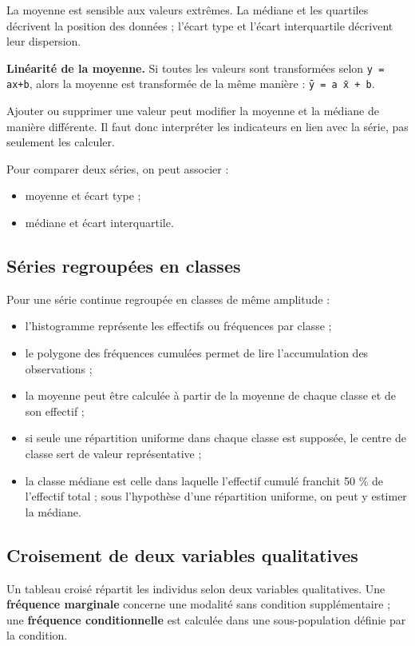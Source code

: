 La moyenne est sensible aux valeurs extrêmes. La médiane et les quartiles décrivent la position des données ; l'écart type et l'écart interquartile décrivent leur dispersion.

\textbf{Linéarité de la moyenne.} Si toutes les valeurs sont transformées selon \texttt{y = ax+b}, alors la moyenne est transformée de la même manière : \texttt{ȳ = a x̄ + b}.

Ajouter ou supprimer une valeur peut modifier la moyenne et la médiane de manière différente. Il faut donc interpréter les indicateurs en lien avec la série, pas seulement les calculer.

Pour comparer deux séries, on peut associer :

\begin{itemize}
\item moyenne et écart type ;
\item médiane et écart interquartile.
\end{itemize}

\subsection{Séries regroupées en classes}

Pour une série continue regroupée en classes de même amplitude :

\begin{itemize}
\item l'histogramme représente les effectifs ou fréquences par classe ;
\item le polygone des fréquences cumulées permet de lire l'accumulation des observations ;
\item la moyenne peut être calculée à partir de la moyenne de chaque classe et de son effectif ;
\item si seule une répartition uniforme dans chaque classe est supposée, le centre de classe sert de valeur représentative ;
\item la classe médiane est celle dans laquelle l'effectif cumulé franchit 50 \% de l'effectif total ; sous l'hypothèse d'une répartition uniforme, on peut y estimer la médiane.
\end{itemize}

\subsection{Croisement de deux variables qualitatives}

Un tableau croisé répartit les individus selon deux variables qualitatives. Une \textbf{fréquence marginale} concerne une modalité sans condition supplémentaire ; une \textbf{fréquence conditionnelle} est calculée dans une sous-population définie par la condition.

